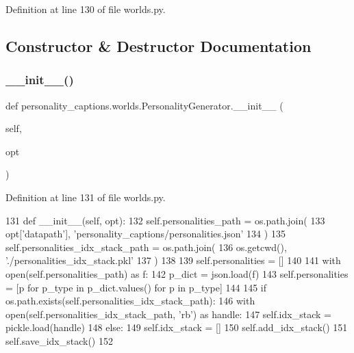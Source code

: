 Definition at line 130 of file worlds.\+py.



\subsection{Constructor \& Destructor Documentation}
\mbox{\label{classpersonality__captions_1_1worlds_1_1PersonalityGenerator_a9964a939fc695387f9f3f4d30b8cea0f}} 
\subsubsection{\texorpdfstring{\+\_\+\+\_\+init\+\_\+\+\_\+()}{\_\_init\_\_()}}
{\footnotesize\ttfamily def personality\+\_\+captions.\+worlds.\+Personality\+Generator.\+\_\+\+\_\+init\+\_\+\+\_\+ (\begin{DoxyParamCaption}\item[{}]{self,  }\item[{}]{opt }\end{DoxyParamCaption})}



Definition at line 131 of file worlds.\+py.


\begin{DoxyCode}
131     \textcolor{keyword}{def }\_\_init\_\_(self, opt):
132         self.personalities\_path = os.path.join(
133             opt[\textcolor{stringliteral}{'datapath'}], \textcolor{stringliteral}{'personality\_captions/personalities.json'}
134         )
135         self.personalities\_idx\_stack\_path = os.path.join(
136             os.getcwd(), \textcolor{stringliteral}{'./personalities\_idx\_stack.pkl'}
137         )
138 
139         self.personalities = []
140 
141         with open(self.personalities\_path) \textcolor{keyword}{as} f:
142             p\_dict = json.load(f)
143             self.personalities = [p \textcolor{keywordflow}{for} p\_type \textcolor{keywordflow}{in} p\_dict.values() \textcolor{keywordflow}{for} p \textcolor{keywordflow}{in} p\_type]
144 
145         \textcolor{keywordflow}{if} os.path.exists(self.personalities\_idx\_stack\_path):
146             with open(self.personalities\_idx\_stack\_path, \textcolor{stringliteral}{'rb'}) \textcolor{keyword}{as} handle:
147                 self.idx\_stack = pickle.load(handle)
148         \textcolor{keywordflow}{else}:
149             self.idx\_stack = []
150             self.add\_idx\_stack()
151             self.save\_idx\_stack()
152 
\end{DoxyCode}


